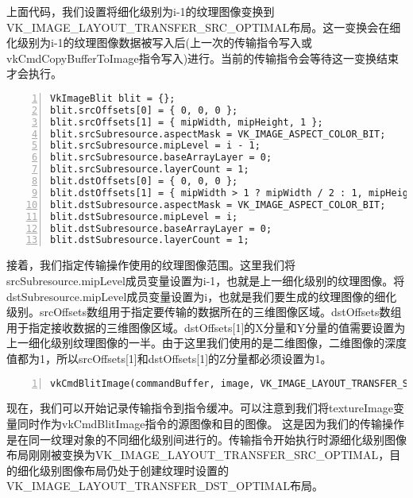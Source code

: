 \documentclass{ctexart}
\begin{document}
上面代码，我们设置将细化级别为i-1的纹理图像变换到VK\_IMAGE\_LAYOUT\_TRANSFER\_SRC\_OPTIMAL布局。这一变换会在细化级别为i-1的纹理图像数据被写入后(上一次的传输指令写入或vkCmdCopyBufferToImage指令写入)进行。当前的传输指令会等待这一变换结束才会执行。

\begin{lstlisting}[language={[ANSI]C},keywordstyle=\color{blue!70},commentstyle=\color{red!50!green!50!blue!50},frame=shadowbox, rulesepcolor=\color{red!20!green!20!blue!20},basicstyle=\small,numbers=left, numberstyle=\tiny,breaklines=true]
VkImageBlit blit = {};
blit.srcOffsets[0] = { 0, 0, 0 };
blit.srcOffsets[1] = { mipWidth, mipHeight, 1 };
blit.srcSubresource.aspectMask = VK_IMAGE_ASPECT_COLOR_BIT;
blit.srcSubresource.mipLevel = i - 1;
blit.srcSubresource.baseArrayLayer = 0;
blit.srcSubresource.layerCount = 1;
blit.dstOffsets[0] = { 0, 0, 0 };
blit.dstOffsets[1] = { mipWidth > 1 ? mipWidth / 2 : 1, mipHeight > 1 ? mipHeight / 2 : 1, 1 };
blit.dstSubresource.aspectMask = VK_IMAGE_ASPECT_COLOR_BIT;
blit.dstSubresource.mipLevel = i;
blit.dstSubresource.baseArrayLayer = 0;
blit.dstSubresource.layerCount = 1;
\end{lstlisting}

接着，我们指定传输操作使用的纹理图像范围。这里我们将srcSubresource.mipLevel成员变量设置为i-1，也就是上一细化级别的纹理图像。将dstSubresource.mipLevel成员变量设置为i，也就是我们要生成的纹理图像的细化级别。srcOffsets数组用于指定要传输的数据所在的三维图像区域。dstOffsets数组用于指定接收数据的三维图像区域。dstOffsets[1]的X分量和Y分量的值需要设置为上一细化级别纹理图像的一半。由于这里我们使用的是二维图像，二维图像的深度值都为1，所以srcOffsets[1]和dstOffsets[1]的Z分量都必须设置为1。

\begin{lstlisting}[language={[ANSI]C},keywordstyle=\color{blue!70},commentstyle=\color{red!50!green!50!blue!50},frame=shadowbox, rulesepcolor=\color{red!20!green!20!blue!20},basicstyle=\small,numbers=left, numberstyle=\tiny,breaklines=true]
vkCmdBlitImage(commandBuffer, image, VK_IMAGE_LAYOUT_TRANSFER_SRC_OPTIMAL, image, VK_IMAGE_LAYOUT_TRANSFER_DST_OPTIMAL, 1, &blit, VK_FILTER_LINEAR);
\end{lstlisting}

现在，我们可以开始记录传输指令到指令缓冲。可以注意到我们将textureImage变量同时作为vkCmdBlitImage指令的源图像和目的图像。 这是因为我们的传输操作是在同一纹理对象的不同细化级别间进行的。传输指令开始执行时源细化级别图像布局刚刚被变换为VK\_IMAGE\_LAYOUT\_TRANSFER\_SRC\_OPTIMAL，目的细化级别图像布局仍处于创建纹理时设置的VK\_IMAGE\_LAYOUT\_TRANSFER\_DST\_OPTIMAL布局。
\end{document}
